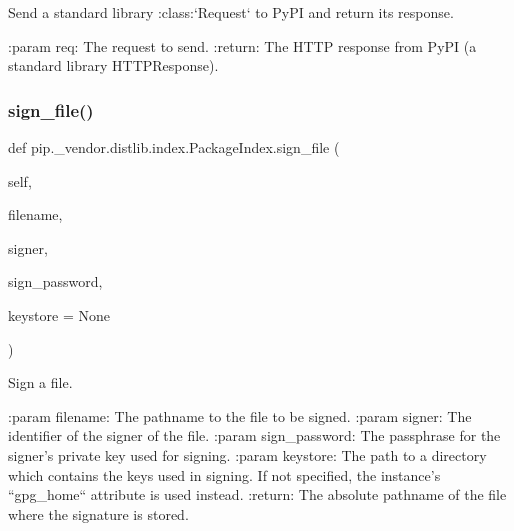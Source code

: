 \begin{DoxyVerb}Send a standard library :class:`Request` to PyPI and return its
response.

:param req: The request to send.
:return: The HTTP response from PyPI (a standard library HTTPResponse).
\end{DoxyVerb}
 \mbox{\label{classpip_1_1__vendor_1_1distlib_1_1index_1_1PackageIndex_a302df05dc81ec9d37ebb5e89972c59d8}} 
\subsubsection{\texorpdfstring{sign\+\_\+file()}{sign\_file()}}
{\footnotesize\ttfamily def pip.\+\_\+vendor.\+distlib.\+index.\+Package\+Index.\+sign\+\_\+file (\begin{DoxyParamCaption}\item[{}]{self,  }\item[{}]{filename,  }\item[{}]{signer,  }\item[{}]{sign\+\_\+password,  }\item[{}]{keystore = {\ttfamily None} }\end{DoxyParamCaption})}

\begin{DoxyVerb}Sign a file.

:param filename: The pathname to the file to be signed.
:param signer: The identifier of the signer of the file.
:param sign_password: The passphrase for the signer's
              private key used for signing.
:param keystore: The path to a directory which contains the keys
         used in signing. If not specified, the instance's
         ``gpg_home`` attribute is used instead.
:return: The absolute pathname of the file where the signature is
 stored.
\end{DoxyVerb}
 \mbox{\label{classpip_1_1__vendor_1_1distlib_1_1index_1_1PackageIndex_adc5a022e3889341bc67a8fed1a4de77a}} 
